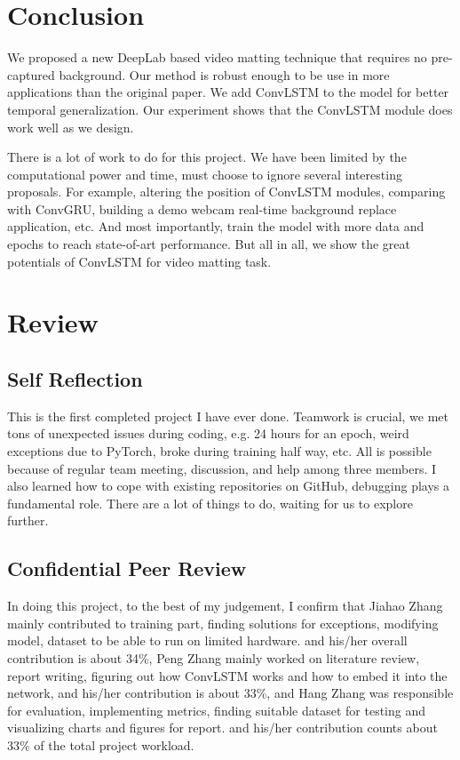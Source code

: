\documentclass[final]{cvpr}
\begin{document}
\section{Conclusion}

We proposed a new DeepLab based video matting technique that requires no pre-captured background.
Our method is robust enough to be use in more applications than the original paper.
We add ConvLSTM to the model for better temporal generalization.
Our experiment shows that the ConvLSTM module does work well as we design.

There is a lot of work to do for this project.
We have been limited by the computational power and time, must choose to ignore several interesting proposals.
For example, altering the position of ConvLSTM modules, comparing with ConvGRU, building a demo webcam real-time background replace application, etc.
And most importantly, train the model with more data and epochs to reach state-of-art performance.
But all in all, we show the great potentials of ConvLSTM for video matting task.




\section{Review}

\subsection{Self Reflection}

This is the first completed project I have ever done.
Teamwork is crucial, we met tons of unexpected issues during coding, e.g. 24 hours for an epoch, weird exceptions due to PyTorch, broke during training half way, etc.
All is possible because of regular team meeting, discussion, and help among three members.
I also learned how to cope with existing repositories on GitHub, debugging plays a fundamental role.
There are a lot of things to do, waiting for us to explore further.

\subsection{Confidential Peer Review}

In doing this project, to the best of my judgement,
I confirm that Jiahao Zhang mainly contributed to training part, finding solutions for exceptions, modifying model, dataset to be able to run on limited hardware.
and his/her overall contribution is about 34\%,
Peng Zhang mainly worked on literature review, report writing, figuring out how ConvLSTM works and how to embed it into the network,
and his/her contribution is about 33\%,
and Hang Zhang was responsible for evaluation, implementing metrics, finding suitable dataset for testing and visualizing charts and figures for report.
and his/her contribution counts about 33\% of the total project workload.
\end{document}
